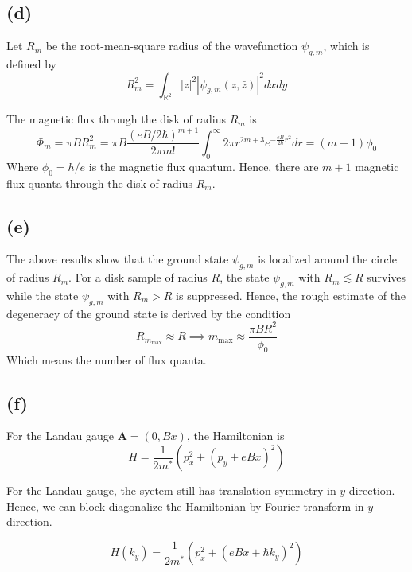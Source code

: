 \documentclass[a4paper,11pt]{article}
\begin{document}
\subsection{(d)}


Let $R_{m}$ be the root-mean-square radius of the wavefunction $\psi_{g, m}$, which is defined by
\begin{equation}
  R_m^2 = \int_{\mathbb{R}^2} |z|^2 |\psi_{g, m}(z, \bar{z})|^2 dx dy
\end{equation}

The magnetic flux through the disk of radius $R_m$ is
\begin{equation}
  \Phi_m = \pi B R_m^2 = \pi B \frac{(eB / 2\hbar)^{m + 1}}{2\pi m!}\int_0^\infty 2\pi r^{2m + 3} e^{-\frac{eB}{2\hbar}r^2} dr = (m + 1) \phi_0
\end{equation}
Where $\phi_0 = h / e$ is the magnetic flux quantum. Hence, there are $m + 1$ magnetic flux quanta through the disk of radius $R_m$.

\subsection{(e)}

The above results show that the ground state $\psi_{g, m}$ is localized around the circle of radius $R_m$. For a disk sample of radius $R$, the state $\psi_{g, m}$ with $R_m \lesssim  R$ survives while the state $\psi_{g, m}$ with $R_m > R$ is suppressed. Hence, the rough estimate of the degeneracy of the ground state is derived by the condition
\begin{equation}
  R_{m_\mathrm{max}} \approx R\implies m_\mathrm{max} \approx \frac{\pi B R^2}{\phi_0}
\end{equation}
Which means the number of flux quanta.


\subsection{(f)}

For the Landau gauge $\mathbf{A} = (0, Bx)$, the Hamiltonian is
\begin{equation}
  H = \frac{1}{2m^*} \left( p_x^2 + (p_y + eBx)^2 \right)
\end{equation}

For the Landau gauge, the syetem still has translation symmetry in $y$-direction. Hence, we can block-diagonalize the Hamiltonian by Fourier transform in $y$-direction.

\begin{equation}
  H(k_y) = \frac{1}{2m^*} \left( p_x^2 + (eBx + \hbar k_y)^2 \right)
\end{equation}
\end{document}
